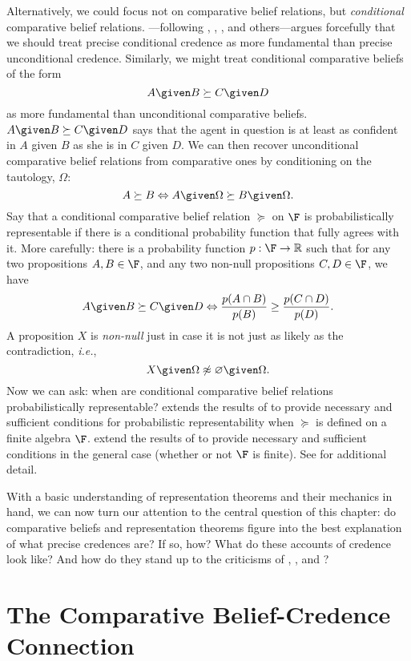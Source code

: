 Alternatively, we could focus not on comparative belief relations, but \textit{conditional} comparative belief relations. \citet{Hajek2003}---following \citet{Renyi1955}, \citet{Jeffreys1961}, \citet{deFinetti1974}, and others---argues forcefully that we should treat precise conditional credence as more fundamental than precise unconditional credence. Similarly, we might treat conditional comparative beliefs of the form
$$ A \given B\succeq C \given D $$
as more fundamental than unconditional comparative beliefs. $A \given B\succeq C \given D$ says that the agent in question is at least as confident in $A$ given $B$ as she is in $C$ given $D$. We can then recover unconditional comparative belief relations from comparative ones by conditioning on the tautology, $\Omega$:
$$ A\succeq B\Leftrightarrow A \given \Omega \succeq B \given \Omega. $$
Say that a conditional comparative belief relation $\succeq$ on $\F$ is probabilistically representable if there is a conditional probability function that fully agrees with it. More carefully: there is a probability function $p:\F\rightarrow\mathbb{R}$ such that for any two propositions $A,B\in\F$, and any two non-null propositions $C,D\in\F$, we have
$$ A \given B\succeq C \given D\Leftrightarrow\frac{p(A\cap B)}{p(B)}\geq\frac{p(C\cap D)}{p(D)}. $$
A proposition $X$ is \textit{non-null} just in case it is not just as likely as the contradiction, \textit{i.e.},
$$ X \given \Omega\not\approx \varnothing \given \Omega. $$
Now we can ask: when are conditional comparative belief relations probabilistically representable? \citet{Domotor1969} extends the results of \citet{Scott1964} to provide necessary and sufficient conditions for probabilistic representability when $\succeq$ is defined on a finite algebra $\F$. \citet{Suppes1982} extend the results of \citet{Suppes1976} to provide necessary and sufficient conditions in the general case (whether or not $\F$ is finite). See \citet{Suppes1994} for additional detail.

With a basic understanding of representation theorems and their mechanics in hand, we can now turn our attention to the central question of this chapter: do comparative beliefs and representation theorems figure into the best explanation of what precise credences are? If so, how? What do these accounts of credence look like? And how do they stand up to the criticisms of \citet{Hajek2009b}, \citet{Meacham2011}, and \citet{Titelbaum2015}?






\section{The Comparative Belief-Credence Connection}\label{konek-sec-3}


